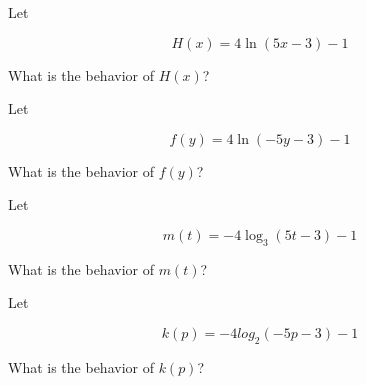 \documentclass{ximera}
\author{Lee Wayand}
\begin{document}
\begin{exercise}


\begin{question}



Let 

\[
H(x) = 4 \ln(5x - 3) - 1
\]


What is the behavior of $H(x)$? 


\begin{multipleChoice}
\end{multipleChoice}

\end{question}







\begin{question}



Let 

\[
f(y) = 4 \ln(-5y - 3) - 1
\]


What is the behavior of $f(y)$? 


\begin{multipleChoice}
\end{multipleChoice}

\end{question}





\begin{question}



Let 

\[
m(t) = -4 \log_3 (5t - 3) - 1
\]


What is the behavior of $m(t)$? 


\begin{multipleChoice}
\end{multipleChoice}

\end{question}








\begin{question}



Let 

\[
k(p) = -4 log_2 (-5p - 3) - 1
\]


What is the behavior of $k(p)$? 


\begin{multipleChoice}
\end{multipleChoice}

\end{question}








\end{exercise}
\end{document}
